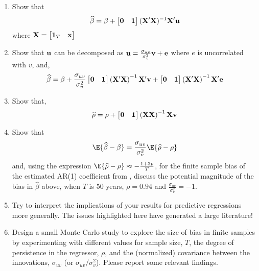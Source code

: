 \begin{enumerate}[label = (\alph*)]
    \item  Show that 
    \[
        \widehat\beta = \beta + \begin{bmatrix}
            \mathbf{0} & \mathbf{1} 
        \end{bmatrix}(\mathbf{X}^\prime \mathbf{X})^{-1}\mathbf{X}^\prime \mathbf{u}
    \]
    where \(\mathbf{X} = \begin{bmatrix} \mathbf{1}_T & \mathbf{x} \end{bmatrix}\)
    \item Show that \(\mathbf{u}\) can be decomposed as \(\mathbf{u} = \frac{\sigma_{uv}}{\sigma_v^2}\mathbf{v} + \mathbf{e}\) where \(e\) is uncorrelated with \(v\), and,
    \[
        \widehat \beta = \beta + \frac{\sigma_{uv}}{\sigma_v^2}\begin{bmatrix}
            \mathbf{0} & \mathbf{1}
        \end{bmatrix}\left(\mathbf{X}^\prime \mathbf{X}\right)^{-1}\mathbf{X}^\prime \mathbf{v} + \begin{bmatrix}
            \mathbf{0} & \mathbf{1}
        \end{bmatrix}\left(\mathbf{X}^\prime \mathbf{X}\right)^{-1}\mathbf{X}^\prime \mathbf{e}
    \]
    \item Show that,
    \[
        \widehat \rho = \rho + \begin{bmatrix}
            \mathbf{0} & \mathbf{1}
        \end{bmatrix}\left(\mathbf{X} \mathbf{X}\right)^{-1}\mathbf{X} \mathbf{v}
    \]
    \item Show that
    \[
        \E{\widehat\beta-\beta} = \frac{\sigma_{uv}}{\sigma_v^2} \E{\widehat\rho - \rho}
    \]
    and, using the expression \(\E{\widehat\rho-\rho}\approx -\frac{1+3p}{T}\), for the finite sample bias of the estimated AR(1) coefficient from \citet{kendall1954note}, discuss the potential magnitude of the bias in \(\widehat\beta\) above, when \(T\) is 50 years, \(\rho = 0.94\) and \(\frac{\sigma_{uv}}{\sigma_v^2} = -1\).
    \item Try to interpret the implications of your results for predictive regressions more generally. The issues highlighted here have generated a large literature!
    \item Design a small Monte Carlo study to explore the size of bias in finite samples by experimenting with different values for sample size, \(T\), the degree of persistence in the regressor, \(\rho\), and the (normalized) covariance between the innovations, \(\sigma_{uv}\) (or \(\sigma_{uv}/\sigma_v^2\)). Please report some relevant findings.
\end{enumerate}